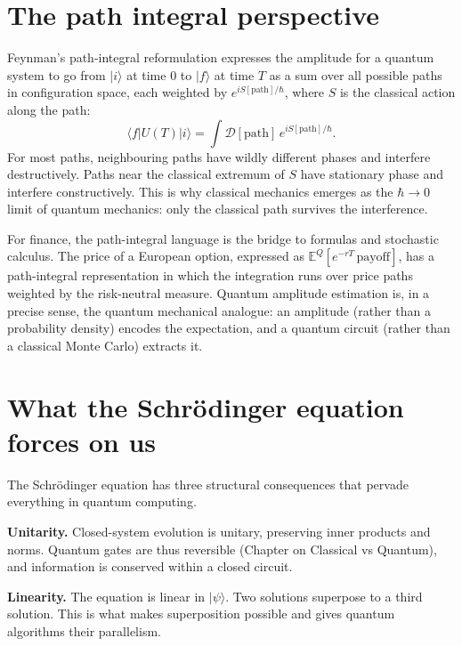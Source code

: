 \section{The path integral perspective}

Feynman's path-integral reformulation \citep{feynman_simulating_1982} expresses the amplitude for a quantum system to go from $|i\rangle$ at time 0 to $|f\rangle$ at time $T$ as a sum over all possible paths in configuration space, each weighted by $e^{iS[\text{path}]/\hbar}$, where $S$ is the classical action along the path:
\[
  \langle f|U(T)|i\rangle = \int \mathcal{D}[\text{path}]\,e^{iS[\text{path}]/\hbar}.
\]
For most paths, neighbouring paths have wildly different phases and interfere destructively. Paths near the classical extremum of $S$ have stationary phase and interfere constructively. This is why classical mechanics emerges as the $\hbar \to 0$ limit of quantum mechanics: only the classical path survives the interference.

For finance, the path-integral language is the bridge to  formulas and stochastic calculus. The price of a European option, expressed as $\mathbb{E}^Q[e^{-rT}\,\text{payoff}]$, has a path-integral representation in which the integration runs over price paths weighted by the risk-neutral measure. Quantum amplitude estimation is, in a precise sense, the quantum mechanical analogue: an amplitude (rather than a probability density) encodes the expectation, and a quantum circuit (rather than a classical Monte Carlo) extracts it.

\section{What the Schr\"odinger equation forces on us}

The Schr\"odinger equation has three structural consequences that pervade everything in quantum computing.

\textbf{Unitarity.} Closed-system evolution is unitary, preserving inner products and norms. Quantum gates are thus reversible (Chapter on Classical vs Quantum), and information is conserved within a closed circuit.

\textbf{Linearity.} The equation is linear in $|\psi\rangle$. Two solutions superpose to a third solution. This is what makes superposition possible and gives quantum algorithms their parallelism.

